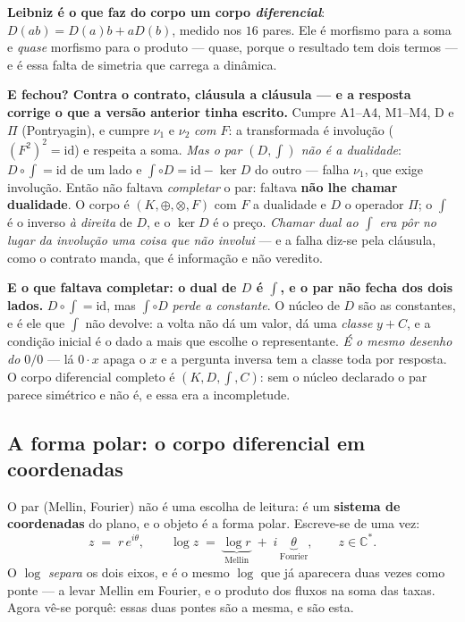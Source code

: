 \documentclass[11pt]{article}
\newcommand{\C}{\mathbb C}
\theoremstyle{plain}
\theoremstyle{remark}
\begin{document}
\begin{itemize}
\textbf{Leibniz é o que faz do corpo um corpo \emph{diferencial}}: $D(ab)=D(a)b+aD(b)$, medido
nos $16$ pares. Ele é morfismo para a soma e \emph{quase} morfismo para o produto --- quase,
porque o resultado tem dois termos --- e é essa falta de simetria que carrega a dinâmica.

\textbf{E fechou? Contra o contrato, cláusula a cláusula --- e a resposta corrige o que a versão anterior tinha
escrito.} Cumpre A1--A4, M1--M4, D e $\Pi$ (Pontryagin), e cumpre $\nu_1$ e $\nu_2$ \emph{com
$F$}: a transformada é involução ($(F^2)^2=\mathrm{id}$) e respeita a soma. \emph{Mas o par
$(D,\int)$ não é a dualidade}: $D\circ\int=\mathrm{id}$ de um lado e $\int\circ D=\mathrm{id}-\ker D$
do outro --- falha $\nu_1$, que exige involução. Então não faltava \emph{completar} o par:
faltava \textbf{não lhe chamar dualidade}. O corpo é $(K,\oplus,\otimes,F)$ com $F$ a dualidade e
$D$ o operador $\Pi$; o $\int$ é o inverso \emph{à direita} de $D$, e o $\ker D$ é o preço.
\emph{Chamar dual ao $\int$ era pôr no lugar da involução uma coisa que não involui} --- e a
falha diz-se pela cláusula, como o contrato manda, que é informação e não veredito.

\textbf{E o que faltava completar: o dual de $D$ é $\int$, e o par não fecha dos dois lados.}
$D\circ\int=\mathrm{id}$, mas $\int\circ D$ \emph{perde a constante}. O núcleo de $D$ são as
constantes, e é ele que $\int$ não devolve: a volta não dá um valor, dá uma \emph{classe} $y+C$, e
a condição inicial é o dado a mais que escolhe o representante. \emph{É o mesmo desenho do $0/0$}
--- lá $0\cdot x$ apaga o $x$ e a pergunta inversa tem a classe toda por resposta. O corpo
diferencial completo é $(K,D,\int,C)$: sem o núcleo declarado o par parece simétrico e não é, e
essa era a incompletude.

\subsection*{A forma polar: o corpo diferencial em coordenadas}

O par (Mellin, Fourier) não é uma escolha de leitura: é um \textbf{sistema de coordenadas} do
plano, e o objeto é a forma polar. Escreve-se de uma vez:
\[
 z \;=\; r\,e^{i\theta},\qquad
 \log z \;=\; \underbrace{\log r}_{\text{Mellin}} \;+\; i\,\underbrace{\theta}_{\text{Fourier}},
 \qquad z\in\C^*.
\]
O $\log$ \emph{separa} os dois eixos, e é o mesmo $\log$ que já aparecera duas vezes como ponte
--- a levar Mellin em Fourier, e o produto dos fluxos na soma das taxas. Agora vê-se porquê: essas
duas pontes são a mesma, e são esta.


\end{itemize}
\end{document}
